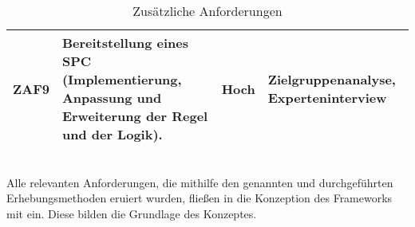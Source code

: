 \begin{table}[hbt!]
\begin{center}
\begin{tabular}{ | p{1.0cm} | p{9.2cm} | p{1.6cm} | p{3.1cm} | }
            \hline
                ZAF9 & Bereitstellung eines \ac{SPC} (Implementierung, Anpassung und Erweiterung der Regel und der Logik). & Hoch & Zielgruppenanalyse, Experteninterview \\ 
            \hline
        \end{tabular}
    \end{center}
    \caption{Zusätzliche Anforderungen}
    \label{tab:furtherRequirements}
\end{table} 
\\
Alle relevanten Anforderungen, die mithilfe den genannten und durchgeführten Erhebungsmethoden eruiert wurden, fließen in die Konzeption 
des Frameworks mit ein. Diese bilden die Grundlage des Konzeptes.
